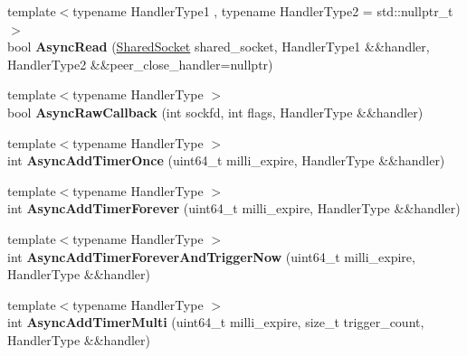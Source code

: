 \begin{DoxyCompactItemize}
\item 
\hypertarget{classlsf_1_1asio_1_1async_1_1ProactorSerivce_a6325d6ce050b29c3168b014cd785bc35}{
{\footnotesize template$<$typename HandlerType1 , typename HandlerType2  = std::nullptr\_\-t$>$ }\\bool {\bfseries AsyncRead} (\hyperlink{classlsf_1_1asio_1_1SharedSocket}{SharedSocket} shared\_\-socket, HandlerType1 \&\&handler, HandlerType2 \&\&peer\_\-close\_\-handler=nullptr)}
\label{classlsf_1_1asio_1_1async_1_1ProactorSerivce_a6325d6ce050b29c3168b014cd785bc35}

\item 
\hypertarget{classlsf_1_1asio_1_1async_1_1ProactorSerivce_a58cfb7b9acceb8603c130dcfc6f34d7c}{
{\footnotesize template$<$typename HandlerType $>$ }\\bool {\bfseries AsyncRawCallback} (int sockfd, int flags, HandlerType \&\&handler)}
\label{classlsf_1_1asio_1_1async_1_1ProactorSerivce_a58cfb7b9acceb8603c130dcfc6f34d7c}

\item 
\hypertarget{classlsf_1_1asio_1_1async_1_1ProactorSerivce_a3b9f3a725367bfa23c792bf92bf8e466}{
{\footnotesize template$<$typename HandlerType $>$ }\\int {\bfseries AsyncAddTimerOnce} (uint64\_\-t milli\_\-expire, HandlerType \&\&handler)}
\label{classlsf_1_1asio_1_1async_1_1ProactorSerivce_a3b9f3a725367bfa23c792bf92bf8e466}

\item 
\hypertarget{classlsf_1_1asio_1_1async_1_1ProactorSerivce_a0c94afc94f98c8dfd79b560db75c5ac7}{
{\footnotesize template$<$typename HandlerType $>$ }\\int {\bfseries AsyncAddTimerForever} (uint64\_\-t milli\_\-expire, HandlerType \&\&handler)}
\label{classlsf_1_1asio_1_1async_1_1ProactorSerivce_a0c94afc94f98c8dfd79b560db75c5ac7}

\item 
\hypertarget{classlsf_1_1asio_1_1async_1_1ProactorSerivce_a66e43eda511faf7b82553de9bb9aaf65}{
{\footnotesize template$<$typename HandlerType $>$ }\\int {\bfseries AsyncAddTimerForeverAndTriggerNow} (uint64\_\-t milli\_\-expire, HandlerType \&\&handler)}
\label{classlsf_1_1asio_1_1async_1_1ProactorSerivce_a66e43eda511faf7b82553de9bb9aaf65}

\item 
\hypertarget{classlsf_1_1asio_1_1async_1_1ProactorSerivce_ac32b291ce74e4caf837bb6c192274cc7}{
{\footnotesize template$<$typename HandlerType $>$ }\\int {\bfseries AsyncAddTimerMulti} (uint64\_\-t milli\_\-expire, size\_\-t trigger\_\-count, HandlerType \&\&handler)}
\label{classlsf_1_1asio_1_1async_1_1ProactorSerivce_ac32b291ce74e4caf837bb6c192274cc7}


\end{DoxyCompactItemize}

